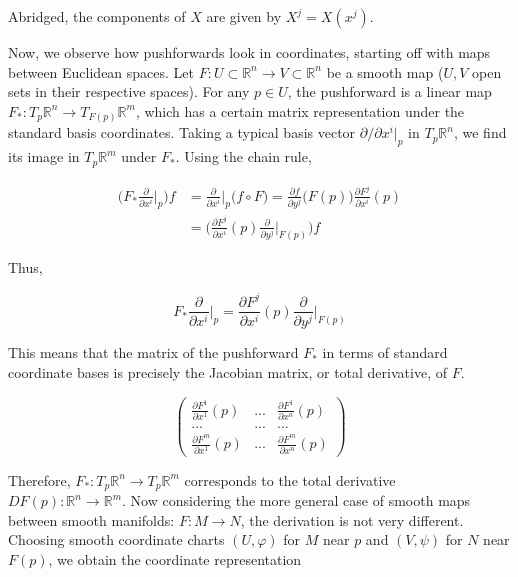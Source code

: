 \documentclass{article}
\theoremstyle{remark}
\theoremstyle{definition}
\begin{document}
    Abridged, the components of $X$ are given by $X^j = X(x^j)$. 

    Now, we observe how pushforwards look in coordinates, starting off with maps between Euclidean spaces. Let $F: U \subset \mathbb{R}^n \longrightarrow V \subset \mathbb{R}^n$ be a smooth map ($U, V$ open sets in their respective spaces). For any $p \in U$, the pushforward is a linear map $F_* : T_p \mathbb{R}^n \longrightarrow T_{F(p)} \mathbb{R}^m$, which has a certain matrix representation under the standard basis coordinates. Taking a typical basis vector $\partial/\partial x^i \big|_p$ in $T_p \mathbb{R}^n$, we find its image in $T_p \mathbb{R}^m$ under $F_*$. Using the chain rule, 

    \begin{align*}
      \bigg( F_* \frac{\partial}{\partial x^i} \bigg|_p \bigg) f & = \frac{\partial}{\partial x^i} \bigg|_p \big( f \circ F \big) = \frac{\partial f}{\partial y^j} \big( F(p)\big) \frac{\partial F^j}{\partial x^i} (p) \\
      & = \bigg( \frac{\partial F^j}{\partial x^i} (p) \frac{\partial}{\partial y^j} \bigg|_{F(p)} \bigg) f 
    \end{align*}

    Thus, 

      \[F_* \frac{\partial}{\partial x^i} \bigg|_p = \frac{\partial F^j}{\partial x^i} (p) \frac{\partial}{\partial y^j} \bigg|_{F(p)}\]

    This means that the matrix of the pushforward $F_*$ in terms of standard coordinate bases is precisely the Jacobian matrix, or total derivative, of $F$. 
    
      \[\begin{pmatrix}
      \frac{\partial F^1}{\partial x^1} (p) & ... & \frac{\partial F^1}{\partial x^n} (p) \\
      ... & ... & ... \\
      \frac{\partial F^m}{\partial x^1} (p) & ... & \frac{\partial F^m}{\partial x^n} (p) 
      \end{pmatrix}\]

    Therefore, $F_*: T_p \mathbb{R}^n \longrightarrow T_p \mathbb{R}^m$ corresponds to the total derivative $D F (p): \mathbb{R}^n \longrightarrow \mathbb{R}^m$. Now considering the more general case of smooth maps between smooth manifolds: $F: M \longrightarrow N$, the derivation is not very different. Choosing smooth coordinate charts $(U, \varphi)$ for $M$ near $p$ and $(V, \psi)$ for $N$ near $F(p)$, we obtain the coordinate representation 
\end{document}

